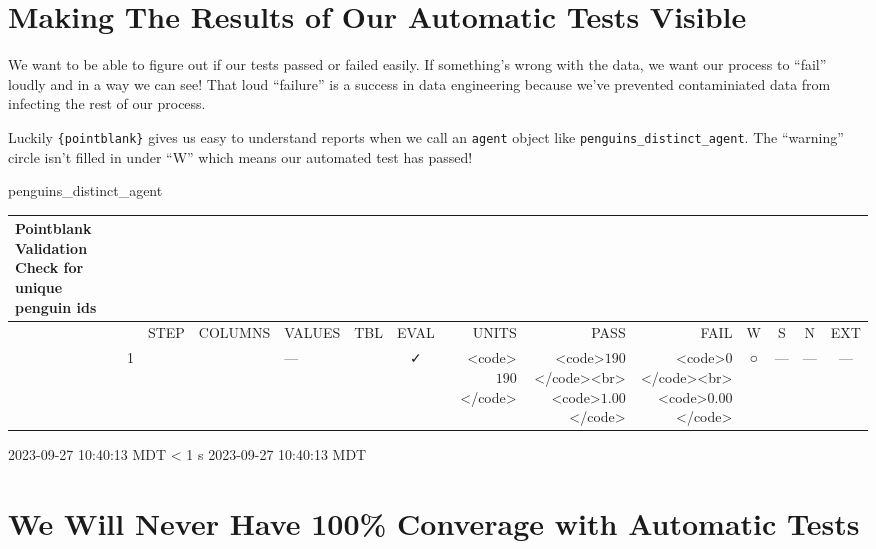 \documentclass[
  letterpaper,
  DIV=11,
  numbers=noendperiod]{scrreprt}
\newenvironment{Shaded}{\begin{snugshade}}{\end{snugshade}}
\newcommand{\NormalTok}[1]{\textcolor[rgb]{0.00,0.23,0.31}{#1}}
\begin{document}
\hypertarget{making-the-results-of-our-automatic-tests-visible}{%
\section{Making The Results of Our Automatic Tests
Visible}\label{making-the-results-of-our-automatic-tests-visible}}

We want to be able to figure out if our tests passed or failed easily.
If something's wrong with the data, we want our process to ``fail''
loudly and in a way we can see! That loud ``failure'' is a success in
data engineering because we've prevented contaminiated data from
infecting the rest of our process.

Luckily \texttt{\{pointblank\}} gives us easy to understand reports when
we call an \texttt{agent} object like
\texttt{penguins\_distinct\_agent}. The ``warning'' circle isn't filled
in under ``W'' which means our automated test has passed!

\begin{Shaded}
\begin{Highlighting}[]
\NormalTok{penguins\_distinct\_agent}
\end{Highlighting}
\end{Shaded}

\setlength{\LTpost}{0mm}
\begin{longtable}{lrlllccrrrcccc}
\caption*{
{\large Pointblank Validation} \\ 
{\small Check for unique penguin ids}
} \\ 
\toprule
 &  & STEP & COLUMNS & VALUES & TBL & EVAL & UNITS & PASS & FAIL & W & S & N & EXT \\ 
\midrule
 & 1 &  &  & — &                                                              & ✓ & <code>$190$</code> & <code>$190$</code><br><code>$1.00$</code> & <code>$0$</code><br><code>$0.00$</code> & ○ & --- & --- & --- \\ 
\bottomrule
\end{longtable}
\begin{minipage}{\linewidth}
2023-09-27 10:40:13 MDT
\textless{} 1 s
2023-09-27 10:40:13 MDT\\
\end{minipage}

\hypertarget{we-will-never-have-100-converage-with-automatic-tests}{%
\section{We Will Never Have 100\% Converage with Automatic
Tests}\label{we-will-never-have-100-converage-with-automatic-tests}}
\end{document}
